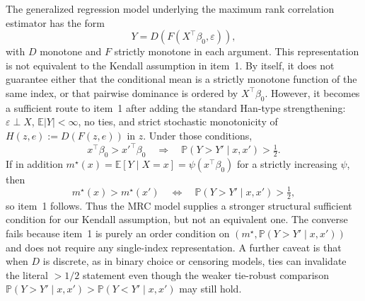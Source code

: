 \begin{remark}
\label{rmk:mrc_relation}
The generalized regression model underlying the maximum rank correlation estimator \citep{han1987non,shin2021exact} has the form
\[
Y = D(F(X^\top \beta_0,\varepsilon)),
\]
with $D$ monotone and $F$ strictly monotone in each argument. This representation is not equivalent to the Kendall assumption in item~1. By itself, it does not guarantee either that the conditional mean is a strictly monotone function of the same index, or that pairwise dominance is ordered by $X^\top \beta_0$. However, it becomes a sufficient route to item~1 after adding the standard Han-type strengthening: $\varepsilon \perp X$, $\mathbb{E}|Y|<\infty$, no ties, and strict stochastic monotonicity of $H(z,e):=D(F(z,e))$ in $z$. Under those conditions,
\[
x^\top\beta_0>x'^\top\beta_0
\quad\Longrightarrow\quad
\mathbb{P}(Y>Y' \mid x,x')>\tfrac12.
\]
If in addition $m^\star(x)=\mathbb{E}[Y\mid X=x]=\psi(x^\top\beta_0)$ for a strictly increasing $\psi$, then
\[
m^\star(x)>m^\star(x')
\quad\Longleftrightarrow\quad
\mathbb{P}(Y>Y' \mid x,x')>\tfrac12,
\]
so item~1 follows. Thus the MRC model supplies a stronger structural sufficient condition for our Kendall assumption, but not an equivalent one. The converse fails because item~1 is purely an order condition on $(m^\star,\mathbb{P}(Y>Y'\mid x,x'))$ and does not require any single-index representation. A further caveat is that when $D$ is discrete, as in binary choice or censoring models, ties can invalidate the literal $>1/2$ statement even though the weaker tie-robust comparison $\mathbb{P}(Y>Y' \mid x,x')>\mathbb{P}(Y<Y' \mid x,x')$ may still hold.
\end{remark}
